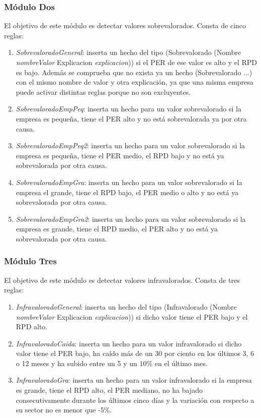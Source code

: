 \documentclass[12pt]{article}
\begin{document}
\subsubsection{Módulo Dos}
El objetivo de este módulo es detectar valores sobrevalorados. Consta de cinco reglas:
\begin{enumerate}
\item \textit{SobrevaloradoGeneral}: inserta un hecho del tipo (Sobrevalorado (Nombre \textit{nombreValor} Explicacion \textit{explicacion})) si el PER de ese valor es alto y el RPD es bajo. Además se comprueba que no exista ya un hecho (Sobrevalorado ...) con el mismo nombre de valor y otra explicación, ya que una misma empresa puede activar distintas reglas porque no son excluyentes.
\item \textit{SobrevaloradoEmpPeq}: inserta un hecho para un valor sobrevalorado si la empresa es pequeña, tiene el PER alto y no está sobrevalorada ya por otra causa.
\item \textit{SobrevaloradoEmpPeq2}: inserta un hecho para un valor sobrevalorado si la empresa es pequeña, tiene el PER medio, el RPD bajo y no está ya sobrevalorada por otra causa.
\item \textit{SobrevaloradoEmpGra}: inserta un hecho para un valor sobrevalorado si la empresa el grande, tiene el RPD bajo, el PER medio o alto y no está ya sobrevalorada por otra causa.
\item \textit{SobrevaloradoEmpGra2}: inserta un hecho para un valor sobrevalorado si la empresa es grande, tiene el RPD medio, el PER alto y no está ya sobrevalorada por otra causa.
\end{enumerate}

\subsubsection{Módulo Tres}
El objetivo de este módulo es detectar valores infravalorados. Consta de tres reglas:
\begin{enumerate}
\item \textit{InfravaloradoGeneral}: inserta un hecho del tipo (Infravalorado (Nombre \textit{nombreValor} Explicacion \textit{explicacion})) si dicho valor tiene el PER bajo y el RPD alto.
\item \textit{InfravaloradoCaida}: inserta un hecho para un valor infravalorado si dicho valor tiene el PER bajo, ha caído más de un 30 por ciento en los últimos 3, 6 o 12 meses y ha subido entre un 5 y un 10\% en el último mes.
\item \textit{InfravaloradoGra}: inserta un hecho para un valor infravalorado si la empresa es grande, tiene el RPD alto, el PER mediano, no ha bajado consecutivamente durante los últimos cinco días y la variación con respecto a su sector no es menor que -5\%.
\end{enumerate}
\end{document}
